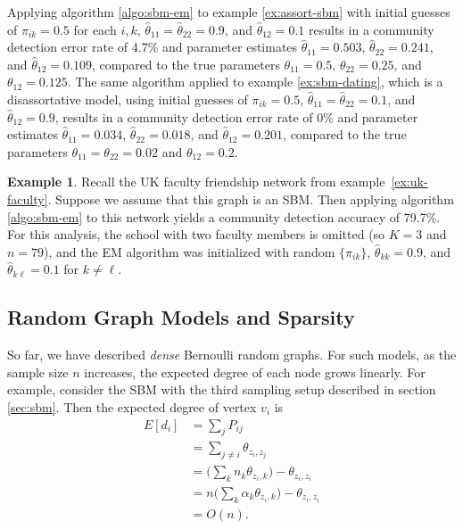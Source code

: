 \documentclass[
  12pt,
]{article}
\theoremstyle{definition}
\theoremstyle{definition}
\newtheorem{example}{Example}[section]
\theoremstyle{definition}
\theoremstyle{definition}
\theoremstyle{remark}
\begin{document}
Applying algorithm \ref{algo:sbm-em} to example \ref{ex:assort-sbm} with initial guesses of \(\pi_{ik} = 0.5\) for each \(i, k\), \(\hat{\theta}_{11} = \hat{\theta}_{22} = 0.9\), and \(\hat{\theta}_{12} = 0.1\) results in a community detection error rate of 4.7\% and parameter estimates \(\hat{\theta}_{11} = 0.503\), \(\hat{\theta}_{22} = 0.241\), and \(\hat{\theta}_{12} = 0.109\), compared to the true parameters \(\theta_{11} = 0.5\), \(\theta_{22} = 0.25\), and \(\theta_{12} = 0.125\).
The same algorithm applied to example \ref{ex:sbm-dating}, which is a disassortative model, using initial guesses of \(\pi_{ik} = 0.5\), \(\hat{\theta}_{11} = \hat{\theta}_{22} = 0.1\), and \(\hat{\theta}_{12} = 0.9\), results in a community detection error rate of 0\% and parameter estimates \(\hat{\theta}_{11} = 0.034\), \(\hat{\theta}_{22} = 0.018\), and \(\hat{\theta}_{12} = 0.201\), compared to the true parameters \(\theta_{11} = \theta_{22} = 0.02\) and \(\theta_{12} = 0.2\).

\begin{example}
\label{ex:uk-faculty-sbm}
Recall the UK faculty friendship network from example~\ref{ex:uk-faculty}. 
Suppose we assume that this graph is an SBM. 
Then applying algorithm \ref{algo:sbm-em} to this network yields a community detection accuracy of 79.7\%. 
For this analysis, the school with two faculty members is omitted (so $K=3$ and $n = 79$), and the EM algorithm was initialized with random $\{\pi_{ik}\}$, $\hat{\theta}_{k k} = 0.9$, and $\hat{\theta}_{k \ell} = 0.1$ for $k \neq \ell$. 

\end{example}

\hypertarget{sec:sparsity}{%
\subsection{Random Graph Models and Sparsity}\label{sec:sparsity}}

So far, we have described \emph{dense} Bernoulli random graphs.
For such models, as the sample size \(n\) increases, the expected degree of each node grows linearly.
For example, consider the SBM with the third sampling setup described in section \ref{sec:sbm}.
Then the expected degree of vertex \(v_i\) is
\[
\begin{split}
E[d_i] & = \sum_j P_{ij} \\
& = \sum_{j \neq i} \theta_{z_i, z_j} \\ 
& = \Big( \sum_k n_k \theta_{z_i, k} \Big) - \theta_{z_i, z_i} \\
& = n \Big( \sum_k \alpha_k \theta_{z_i, k} \Big) - \theta_{z_i, z_i} \\
& = O(n).
\end{split}
\]
\end{document}
